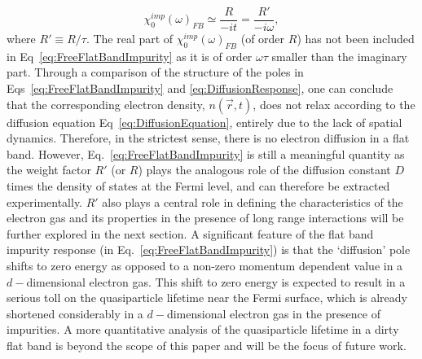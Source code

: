 \documentclass[prl,aps,twocolumn,groupaddress]{revtex4-1}
\begin{document}
\begin{equation}
\chi_0^{imp}(\omega)_{FB} \simeq \frac{R}{-i t} = \frac{R'}{-i \omega},
\label{eq:FreeFlatBandImpurity}
\end{equation}
where $R' \equiv R/\tau$. The real part of $\chi_0^{imp}(\omega)_{FB}$ (of order $R$) has not been included in Eq~\ref{eq:FreeFlatBandImpurity} as it is of order $\omega\tau$ smaller than the imaginary part. Through a comparison of the structure of the poles in Eqs~\ref{eq:FreeFlatBandImpurity} and \ref{eq:DiffusionResponse}, one can conclude that the corresponding electron density, $n(\vec r, t)$, does not relax according to the diffusion equation Eq~\ref{eq:DiffusionEquation}, entirely due to the lack of spatial dynamics. Therefore, in the strictest sense, there is no electron diffusion in a flat band. However, Eq.~\ref{eq:FreeFlatBandImpurity} is still a meaningful quantity as the weight factor $R'$ (or $R$) plays the analogous role of the diffusion constant $D$ times the density of states at the Fermi level, and can therefore be extracted experimentally. $R'$ also plays a central role in defining the characteristics of the electron gas and its properties in the presence of long range interactions will be further explored in the next section. A significant feature of the flat band impurity response (in Eq.~\ref{eq:FreeFlatBandImpurity}) is that the `diffusion' pole shifts to zero energy as opposed to a non-zero momentum dependent value in a $d-$dimensional electron gas. This shift to zero energy is expected to result in a serious toll on the quasiparticle lifetime near the Fermi surface, which is already shortened considerably in a $d-$dimensional electron gas in the presence of impurities. A more quantitative analysis of the quasiparticle lifetime in a dirty flat band is beyond the scope of this paper and will be the focus of future work.  \newline \\
\end{document}
